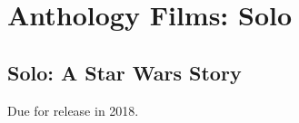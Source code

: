 \chapter{Anthology Films: Solo}
		\label{appendixB}


\section{Solo: A Star Wars Story}

Due for release in 2018.


